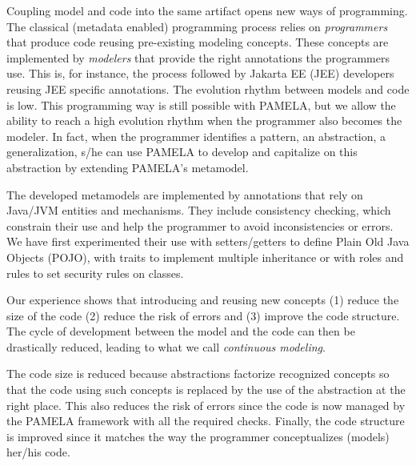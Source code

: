 Coupling model and code into the same artifact opens new ways of programming. The classical (metadata enabled) programming process relies on \emph{programmers} that produce code reusing pre-existing modeling concepts. These concepts are implemented by \emph{modelers} that provide the right annotations the programmers use. This is, for instance, the process followed by Jakarta EE (JEE) developers reusing JEE specific annotations. 
The evolution rhythm between models and code is low. This programming way is still possible with PAMELA, but we allow the ability to reach a high evolution rhythm when the programmer also becomes the modeler. In fact, when the programmer identifies a pattern, an abstraction, a generalization, s/he can use PAMELA to develop and capitalize on this abstraction by extending PAMELA's metamodel. 

The developed metamodels are implemented by annotations that rely on Java/JVM entities and mechanisms. They include consistency checking, which constrain their use and help the programmer to avoid inconsistencies or errors. We have first experimented their use with setters/getters to define Plain Old Java Objects (POJO), with traits to implement multiple inheritance or with roles and rules to set security rules on classes.

Our experience shows that introducing and reusing new concepts (1) reduce the size of the code (2) reduce the risk of errors and (3) improve the code structure. The cycle of development between the model and the code can then be drastically reduced, leading to what we call \emph{continuous modeling}.

The code size is reduced because abstractions factorize recognized concepts so that the code using such concepts is replaced by the use of the abstraction at the right place. This also reduces the risk of errors since the code is now managed by the PAMELA framework with all the required checks. Finally, the code structure is improved since it matches the way the programmer conceptualizes (models) her/his code.

